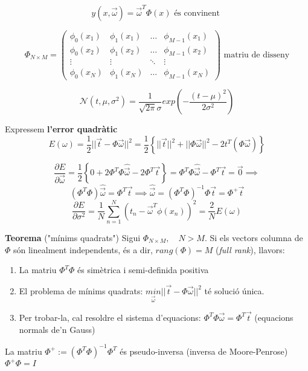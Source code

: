 \documentclass[a4paper]{article}
\begin{document}
$$
\boxed{y(x, \vec{\omega}) = \vec{\omega}^T \Phi(x)} \text{ és convinent }
$$

$$
\Phi_{N \times M} =
\begin{pmatrix}
\phi_0 (x_1) & \phi_1(x_1) & \ldots & \phi_{M-1} (x_1) \\
\phi_0 (x_2) & \phi_1(x_2) & \ldots & \phi_{M-1} (x_2) \\
\vdots & \vdots & \ddots & \vdots \\
\phi_0 (x_N) & \phi_1(x_N) & \ldots & \phi_{M-1} (x_N)
\end{pmatrix}
\text{ matriu de disseny}
$$

$$
\mathcal{N}(t, \mu, \sigma^2) = \frac{1}{\sqrt{2 \pi} \sigma} exp \left( - \frac{(t - \mu)^2}{2\sigma^2} \right)
$$

Expressem \textbf{l'error quadràtic}
$$
E(\omega) = \frac{1}{2} || \vec{t} - \Phi \vec{\omega} ||^2 = \frac{1}{2} \left\{ ||\vec{t}||^2 + ||\Phi \vec{\omega}||^2 - 2t^T(\Phi \vec{\omega}) \right\}
$$

$$
\frac{\partial E}{\partial \vec{\omega}} = \frac{1}{2} \left\{ 0 + 2 \Phi^T \Phi \hat{\vec{\omega}} - 2 \Phi^T \vec{t} \right\} = \Phi^T \Phi \hat{\vec{\omega}} - \Phi^T \vec{t} = \vec{0} \implies
$$
$$
\left( \Phi^T \Phi \right) \hat{\vec{\omega}} = \Phi^T \vec{t} \implies
\boxed{\hat{\vec{\omega}} = (\Phi^T \Phi)^{-1} \Phi \vec{t}} = \Phi^+ \vec{t}
$$
$$
\frac{\partial E}{\partial \sigma^2} = \frac{1}{N} \sum_{n=1}^N (t_n - \vec{\omega}^T \phi(x_n))^2 = \frac{2}{N} E(\omega)
$$

\textbf{Teorema} ("mínims quadrats")
Sigui $\Phi_{N\times M}, \quad N > M$. Si els vectors columna de $\Phi$ són linealment independents, és a dir, $rang(\Phi) = M$ (\emph{full rank}), llavors:

\begin{enumerate}
	\item La matriu $\Phi^T\Phi$ és simètrica i semi-definida positiva
	\item El problema de mínims quadrats: 
	$\underset{\vec{\omega}}{min} ||\vec{t} - \Phi \vec{\omega}||^2$ té solució única.
	\item Per trobar-la, cal resoldre el sistema d'equacions: $\Phi^T\Phi \vec{\omega} = \Phi^T \vec{t}$ (equacions normals de'n Gauss)
\end{enumerate}

La matriu $ \Phi^+ := \left( \Phi^T \Phi \right)^{-1} \Phi^T $ és pseudo-inversa (inversa de Moore-Penrose) $ \Phi^+ \Phi = I $
\end{document}

